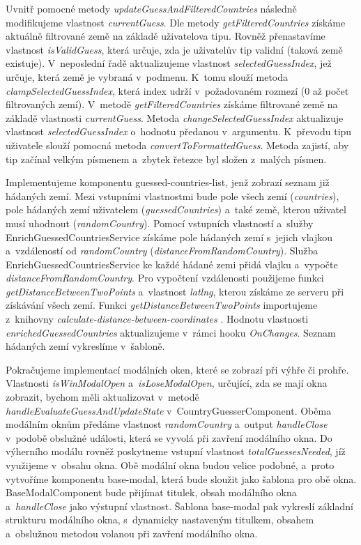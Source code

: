 Uvnitř pomocné metody \emph{updateGuessAndFilteredCountries} následně modifikujeme vlastnost \emph{currentGuess}. 
Dle metody \emph{getFilteredCountries} získáme aktuálně filtrované země na základě uživatelova tipu. 
Rovněž přenastavíme vlastnost \emph{isValidGuess}, která určuje, zda je uživatelův tip validní (taková země existuje). 
V~neposlední řadě aktualizujeme vlastnost \emph{selectedGuessIndex}, jež určuje, která země je vybraná v~podmenu. 
K~tomu slouží metoda \emph{clampSelectedGuessIndex}, která index udrží v~požadovaném rozmezí (0 až počet filtrovaných zemí).
V~metodě \emph{getFilteredCountries} získáme filtrované země na základě vlastnosti \emph{currentGuess}. 
Metoda \emph{changeSelectedGuessIndex} aktualizuje vlastnost \emph{selectedGuessIndex} o~hodnotu předanou v~argumentu. 
K~převodu tipu uživatele slouží pomocná metoda \emph{convertToFormattedGuess}. Metoda zajistí, aby tip začínal velkým písmenem a~zbytek řetezce byl složen z~malých písmen.

Implementujeme komponentu guessed-countries-list, jenž zobrazí seznam již hádaných zemí. 
Mezi vstupními vlastnostmi bude pole všech zemí (\emph{countries}), pole hádaných zemí uživatelem (\emph{guessedCountries}) a~také země, kterou uživatel musí uhodnout (\emph{randomCountry}).
Pomocí vstupních vlastností a~služby EnrichGuessedCountriesService získáme pole hádaných zemí s~jejich vlajkou a~vzdáleností od \emph{randomCountry} (\emph{distanceFromRandomCountry}).
Služba EnrichGuessedCountriesService ke každé hádané zemi přidá vlajku a~vypočte \emph{distanceFromRandomCountry}. 
Pro vypočtení vzdálenosti použijeme funkci \emph{getDistanceBetweenTwoPoints} a~vlastnost \emph{latlng}, kterou získáme ze serveru při získávání všech zemí. 
Funkci \emph{getDistanceBetweenTwoPoints} importujeme z~knihovny \emph{calculate-distance-between-coordinates} \cite{distancebetweencoordinates}. 
Hodnotu vlastnosti \emph{enrichedGuessedCountries} aktualizujeme v~rámci hooku \emph{OnChanges}. Seznam hádaných zemí vykreslíme v~šabloně.

Pokračujeme implementací modálních oken, které se zobrazí při výhře či prohře. 
Vlastnosti \emph{isWinModalOpen} a~\emph{isLoseModalOpen}, určující, zda se mají okna zobrazit, bychom měli aktualizovat v~metodě \emph{handleEvaluateGuessAndUpdateState} v~CountryGuesserComponent. 
Oběma modálním oknům předáme vlastnost \emph{randomCountry} a~output \emph{handleClose} v~podobě obslužné události, která se vyvolá při zavření modálního okna. 
Do výherního modálu rovněž poskytneme vstupní vlastnost \emph{totalGuessesNeeded}, jíž využijeme v~obsahu okna. 
Obě modální okna budou velice podobné, a~proto vytvoříme komponentu base-modal, která bude sloužit jako šablona pro obě okna. 
BaseModalComponent bude přijímat titulek, obsah modálního okna a~\emph{handleClose} jako výstupní vlastnost. 
Šablona base-modal pak vykreslí základní strukturu modálního okna, s~dynamicky nastaveným titulkem, obsahem a~obslužnou metodou volanou při zavření modálního okna.

